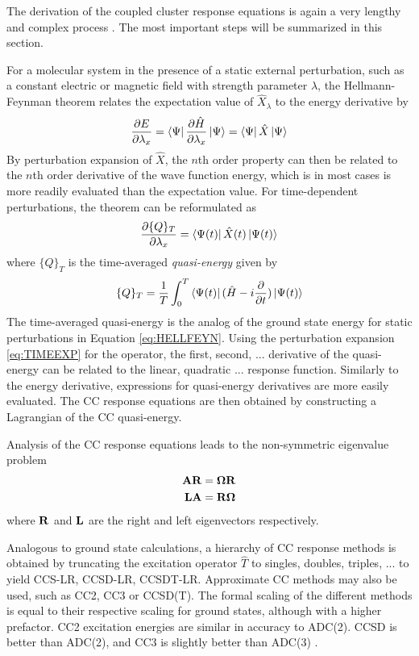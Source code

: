 The derivation of the coupled cluster response equations is again a very lengthy and complex process \cite{Koc1990,Chr1998}. The most important steps will be summarized in this section.

For a molecular system in the presence of a static external perturbation, such as a constant electric or magnetic field with strength parameter $\lambda$, the Hellmann-Feynman theorem relates the expectation value of $\hat{X}_{\lambda}$ to the energy derivative by
\begin{equation}
\frac{\partial E}{\partial \lambda_x} = \bra{\smash{\Psi}}\frac{\partial \hat{H}}{\partial \lambda_x} \ket{\smash{\Psi}} = \bra{\smash{\Psi}}\hat{X} \ket{\smash{\Psi}}
\label{eq:HELLFEYN}
\end{equation}
\noindent By perturbation expansion of $\hat{X}$, the $n$th order property can then be related to the $n$th order derivative of the wave function energy, which is in most cases is more readily evaluated than the expectation value. For time-dependent perturbations, the theorem can be reformulated as 
\begin{equation}
\frac{\partial \{Q\}_T}{\partial \lambda_x} = \bra{\smash{\Psi(t)}} \hat{X}(t) \ket{\smash{\Psi(t)}} 
\end{equation}
\noindent where $\{Q\}_T$ is the time-averaged \emph{quasi-energy} given by
\begin{equation}
\{Q\}_T = \frac{1}{T} \int_0^T \bra{\smash{\Psi(t)}} (\hat{H} - i\frac{\partial}{\partial t})\ket{\smash{\Psi(t)}}
\label{eq:HELLFEYN2}
\end{equation}
\noindent The time-averaged quasi-energy is the analog of the ground state energy for static perturbations in Equation \ref{eq:HELLFEYN}. Using the perturbation expansion \ref{eq:TIMEEXP} for the operator, the first, second, ... derivative of the quasi-energy can be related to the linear, quadratic ... response function. Similarly to the energy derivative, expressions for quasi-energy derivatives are more easily evaluated. The CC response equations are then obtained by constructing a Lagrangian of the CC quasi-energy. 

Analysis of the CC response equations leads to the non-symmetric eigenvalue problem
\begin{align}
\mathbf{A}\mathbf{R} &= \mathbf{\Omega}\mathbf{R} \\
\mathbf{L}\mathbf{A} &= \mathbf{R}\mathbf{\Omega} 
\end{align} 
\noindent where $\mathbf{R}$ and $\mathbf{L}$ are the right and left eigenvectors respectively.

Analogous to ground state calculations, a hierarchy of CC response methods is obtained by truncating the excitation operator $\hat{T}$ to singles, doubles, triples, ... to yield CCS-LR, CCSD-LR, CCSDT-LR. Approximate CC methods may also be used, such as CC2, CC3 or CCSD(T). The formal scaling of the different methods is equal to their respective scaling for ground states, although with a higher prefactor. CC2 excitation energies are similar in accuracy to ADC(2). CCSD is better than ADC(2), and CC3 is slightly better than ADC(3) \cite{Loo2020}. 

